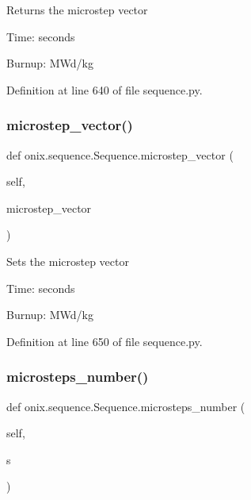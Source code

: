 \begin{DoxyVerb}Returns the microstep vector

Time: seconds

Burnup: MWd/kg
\end{DoxyVerb}
 

Definition at line 640 of file sequence.\+py.

\mbox{\label{classonix_1_1sequence_1_1Sequence_a1750acb3c5ce8469efc1c149787b1eff}} 
\subsubsection{\texorpdfstring{microstep\+\_\+vector()}{microstep\_vector()}\hspace{0.1cm}{\footnotesize\ttfamily [2/2]}}
{\footnotesize\ttfamily def onix.\+sequence.\+Sequence.\+microstep\+\_\+vector (\begin{DoxyParamCaption}\item[{}]{self,  }\item[{}]{microstep\+\_\+vector }\end{DoxyParamCaption})}

\begin{DoxyVerb}Sets the microstep vector

Time: seconds

Burnup: MWd/kg
\end{DoxyVerb}
 

Definition at line 650 of file sequence.\+py.

\mbox{\label{classonix_1_1sequence_1_1Sequence_a187bb8caa6ec692cb6302ef39020e462}} 
\subsubsection{\texorpdfstring{microsteps\+\_\+number()}{microsteps\_number()}}
{\footnotesize\ttfamily def onix.\+sequence.\+Sequence.\+microsteps\+\_\+number (\begin{DoxyParamCaption}\item[{}]{self,  }\item[{}]{s }\end{DoxyParamCaption})}

